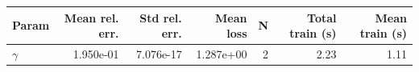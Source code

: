 \begin{tabular}{lrrrrrr}
\hline
Param & Mean rel. err. & Std rel. err. & Mean loss & N & Total train (s) & Mean train (s) \\
\hline
$\gamma$ & 1.950e-01 & 7.076e-17 & 1.287e+00 & 2 & 2.23 & 1.11 \\
\hline
\end{tabular}
